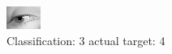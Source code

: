 \begin{figure}[h!]
\begin{center}
\includegraphics[width=0.60\columnwidth]{figures/ID2993_class_3_target_4.png}
\end{center}
\caption{ Classification: 3 actual target: 4}
\label{fig:ID2993_class_3_target_4}
\end{figure}
